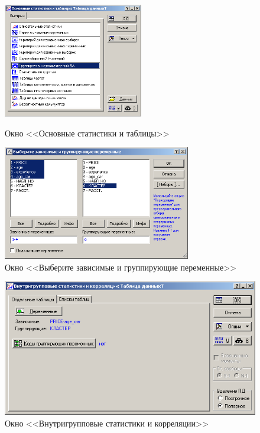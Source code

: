 \begin{figure}[!h]
  \centering
  \begin{minipage}{0.49\textwidth}
    \centering

    \includegraphics[height=5cm]
    {inc/cars_my/3.9.PNG}

    \caption{Окно <<Основные статистики и таблицы>>}
    \label{fig:3_9}
  \end{minipage}
  \begin{minipage}{0.49\textwidth}
    \centering

    \includegraphics[height=5cm]
    {inc/cars_my/3.10.PNG}

    \caption{Окно <<Выберите зависимые и группирующие переменные>>}
    \label{fig:3_10}
  \end{minipage}
\end{figure}

\begin{figure}[!ph]
  \centering

  \includegraphics[width=12cm]
  {inc/cars_my/3.11.PNG}

  \caption{Окно <<Внутригрупповые статистики и корреляции>>}
  \label{fig:3_11}
\end{figure}


